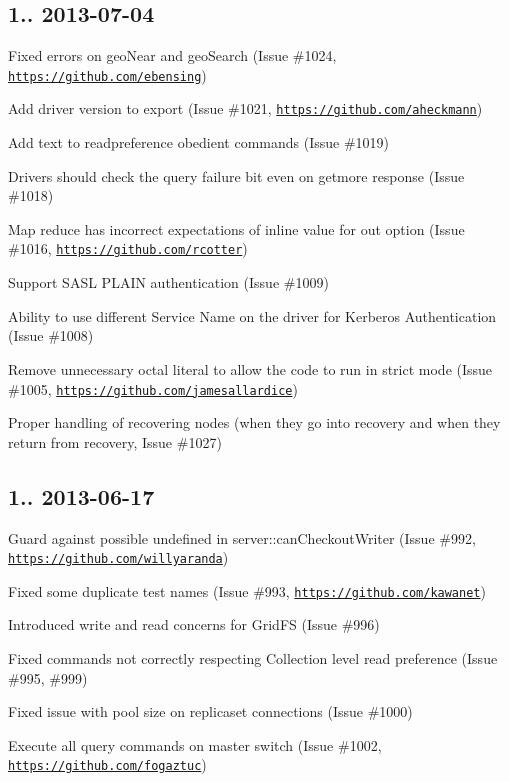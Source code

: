 \subsection*{1.. 2013-\/07-\/04 }


\begin{DoxyItemize}
\item Fixed errors on geo\+Near and geo\+Search (Issue \#1024, \href{https://github.com/ebensing}{\tt https\+://github.\+com/ebensing})
\item Add driver version to export (Issue \#1021, \href{https://github.com/aheckmann}{\tt https\+://github.\+com/aheckmann})
\item Add text to readpreference obedient commands (Issue \#1019)
\item Drivers should check the query failure bit even on getmore response (Issue \#1018)
\item Map reduce has incorrect expectations of \textquotesingle{}inline\textquotesingle{} value for \textquotesingle{}out\textquotesingle{} option (Issue \#1016, \href{https://github.com/rcotter}{\tt https\+://github.\+com/rcotter})
\item Support S\+A\+SL P\+L\+A\+IN authentication (Issue \#1009)
\item Ability to use different Service Name on the driver for Kerberos Authentication (Issue \#1008)
\item Remove unnecessary octal literal to allow the code to run in strict mode (Issue \#1005, \href{https://github.com/jamesallardice}{\tt https\+://github.\+com/jamesallardice})
\item Proper handling of recovering nodes (when they go into recovery and when they return from recovery, Issue \#1027)
\end{DoxyItemize}

\subsection*{1.. 2013-\/06-\/17 }


\begin{DoxyItemize}
\item Guard against possible undefined in server\+::can\+Checkout\+Writer (Issue \#992, \href{https://github.com/willyaranda}{\tt https\+://github.\+com/willyaranda})
\item Fixed some duplicate test names (Issue \#993, \href{https://github.com/kawanet}{\tt https\+://github.\+com/kawanet})
\item Introduced write and read concerns for Grid\+FS (Issue \#996)
\item Fixed commands not correctly respecting Collection level read preference (Issue \#995, \#999)
\item Fixed issue with pool size on replicaset connections (Issue \#1000)
\item Execute all query commands on master switch (Issue \#1002, \href{https://github.com/fogaztuc}{\tt https\+://github.\+com/fogaztuc})
\end{DoxyItemize}

